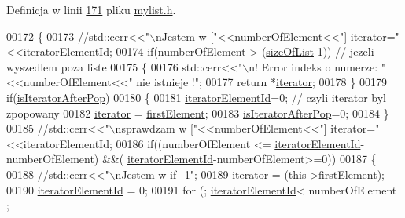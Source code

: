 Definicja w linii \hyperlink{mylist_8h_source_l00171}{171} pliku \hyperlink{mylist_8h_source}{mylist.\-h}.


\begin{DoxyCode}
00172         \{
00173                 \textcolor{comment}{//std::cerr<<"\(\backslash\)nJestem w ["<<numberOfElement<<"] iterator="<<iteratorElementId;}
00174                 \textcolor{keywordflow}{if}(numberOfElement > (\hyperlink{class_my_list_a5a3a323664c97313be3a8d0b36866c3f}{sizeOfList}-1)) \textcolor{comment}{// jezeli wyszedlem poza liste}
00175                         \{
00176                                 std::cerr<<\textcolor{stringliteral}{"\(\backslash\)n! Error indeks o numerze: "}<<numberOfElement<<\textcolor{stringliteral}{" nie istnieje
       !"};
00177                                 \textcolor{keywordflow}{return} *\hyperlink{class_my_list_aecf059ed6926a3d6eb82641d46a3e3ff}{iterator};
00178                         \}
00179                 \textcolor{keywordflow}{if}(\hyperlink{class_my_list_a1041f18464ae98367844d13aa2e7b5a6}{isIteratorAfterPop})
00180                         \{
00181                                 \hyperlink{class_my_list_ad27795091bcc0c321d81c2196bc1cbb0}{iteratorElementId}=0;  \textcolor{comment}{// czyli iterator byl zpopowany}
00182                                 \hyperlink{class_my_list_aecf059ed6926a3d6eb82641d46a3e3ff}{iterator} = \hyperlink{class_my_list_a15131c9e2f10a393a916c64e901a1290}{firstElement};
00183                                 \hyperlink{class_my_list_a1041f18464ae98367844d13aa2e7b5a6}{isIteratorAfterPop}=0;
00184                         \}
00185                 \textcolor{comment}{//std::cerr<<"\(\backslash\)nsprawdzam w ["<<numberOfElement<<"] iterator="<<iteratorElementId;}
00186                 \textcolor{keywordflow}{if}((numberOfElement <= \hyperlink{class_my_list_ad27795091bcc0c321d81c2196bc1cbb0}{iteratorElementId}-numberOfElement) &&(
      \hyperlink{class_my_list_ad27795091bcc0c321d81c2196bc1cbb0}{iteratorElementId}-numberOfElement>=0))
00187                 \{
00188                         \textcolor{comment}{//std::cerr<<"\(\backslash\)nJestem w if\_1";}
00189                         \hyperlink{class_my_list_aecf059ed6926a3d6eb82641d46a3e3ff}{iterator} = (this->\hyperlink{class_my_list_a15131c9e2f10a393a916c64e901a1290}{firstElement});
00190                         \hyperlink{class_my_list_ad27795091bcc0c321d81c2196bc1cbb0}{iteratorElementId} = 0;
00191                         \textcolor{keywordflow}{for} (; \hyperlink{class_my_list_ad27795091bcc0c321d81c2196bc1cbb0}{iteratorElementId}< numberOfElement ; 

\end{DoxyCode}
